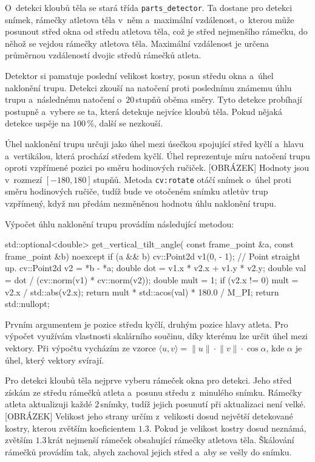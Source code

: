 O~detekci kloubů těla se stará třída \texttt{parts\_detector}. Ta dostane pro detekci snímek, rámečky atletova těla v~něm a~maximální vzdálenost, o~kterou může posunout střed okna od středu atletova těla, což je střed nejmenšího rámečku, do něhož se vejdou rámečky atletova těla. Maximální vzdálenost je určena průměrnou vzdáleností dvojic středů rámečků atleta.

Detektor si pamatuje poslední velikost kostry, posun středu okna a~úhel naklonění trupu. Detekci zkouší na natočení proti poslednímu známemu úhlu trupu a~následnému natočení o~$20$\,\rm stupňů oběma směry. Tyto detekce probíhají postupně a~vybere se ta, která detekuje nejvíce kloubů těla. Pokud nějaká detekce uspěje na $100$\,\rm \%, další se nezkouší.

Úhel naklonění trupu určuji jako úhel mezi úsečkou spojující střed kyčlí a~hlavu a~vertikálou, která prochází středem kyčlí. Úhel reprezentuje míru natočení trupu oproti vzpřímené pozici po směru hodinových ručiček. [OBRÁZEK] Hodnoty jsou v~rozmezí $[-180,180]$\,\rm stupňů. Metoda \texttt{cv\::rotate} otáčí snímek o~úhel proti směru hodinových ručiče, tudíž bude ve otočeném snímku atletův trup vzpřímený, když mu předám nezměněnou hodnotu úhlu naklonění trupu.

Výpočet úhlu naklonění trupu provádím následující metodou:
\begin{code}[fontsize=\footnotesize]
std::optional<double> get_vertical_tilt_angle(
    const frame_point &a,
    const frame_point &b) noexcept {
        if (a && b) {
            cv::Point2d v1(0, - 1); // Point straight up.
            cv::Point2d v2 = *b - *a;
            double dot = v1.x * v2.x + v1.y * v2.y;
            double val = dot / (cv::norm(v1) * cv::norm(v2));
            double mult = 1;
            if (v2.x != 0)
                mult = v2.x / std::abs(v2.x);
            return mult * std::acos(val) * 180.0 / M_PI;
        }
        return std::nullopt;
}
\end{code}
Prvním argumentem je pozice středu kyčlí, druhým pozice hlavy atleta. Pro výpočet využívám vlastnosti skalárního součinu, díky kterému lze určit úhel mezi vektory. Při výpočtu vycházím ze vzorce $\langle u,v\rangle=\lVert u\rVert\cdot\lVert v\rVert\cdot\cos\alpha$, kde $\alpha$ je úhel, který vektory svírají.

Pro detekci kloubů těla nejprve vyberu rámeček okna pro detekci. Jeho střed získám ze středu rámečků atleta a~posunu středu z~minulého snímku. Rámečky atleta aktualizuji každé $2$\,\rm snímky, tudíž jejich posunutí při aktualizaci není velké. [OBRÁZEK] Velikost jeho strany určím z~velikosti dosud největší detekované kostry, kterou zvětším koeficientem $1.3$. Pokud je velikost kostry dosud neznámá, zvětším $1.3$\,\rm krát nejmenší rámeček obsahující rámečky atletova těla. Škálování rámečků provádím tak, abych zachoval jejich střed a~aby se vešly do snímku.

